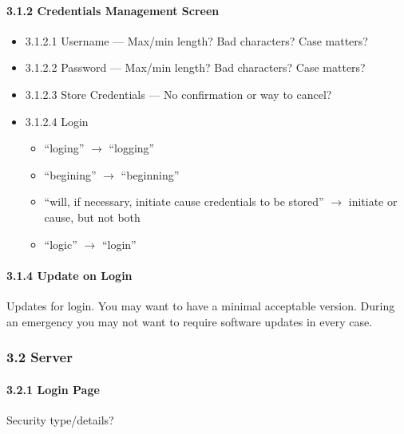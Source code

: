 \documentclass{article}
\begin{document}
\paragraph{3.1.2 Credentials Management Screen}

\begin{itemize}
    \item 3.1.2.1 Username --- Max/min length?  Bad characters?  Case
        matters?
    \item 3.1.2.2 Password --- Max/min length?  Bad characters?  Case
        matters?
    \item 3.1.2.3 Store Credentials --- No confirmation or way to cancel?
    \item 3.1.2.4  Login
    \begin{itemize}
        \item ``loging'' $\rightarrow$ ``logging''
        \item ``begining'' $\rightarrow$ ``beginning''
        \item ``will, if necessary, initiate cause credentials to be stored''
            $\rightarrow$ initiate or cause, but not both
        \item ``logic'' $\rightarrow$ ``login''
    \end{itemize}
\end{itemize}


\paragraph{3.1.4 Update on Login}

Updates for login. You may want to have a minimal acceptable version.  During
an emergency you may not want to require software updates in every case.


\subsubsection{3.2 Server}

\paragraph{3.2.1 Login Page} Security type/details?

\end{document}
